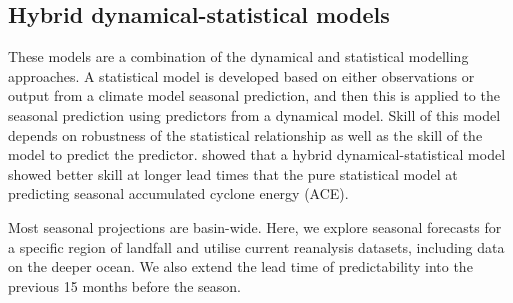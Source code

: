 \subsection{Hybrid dynamical-statistical models}  
These models are a combination of the dynamical and statistical modelling approaches. A statistical model is developed based on either observations or output from a climate model seasonal prediction, and then this is applied to the seasonal prediction using predictors from a dynamical model. Skill of this model depends on robustness of the statistical relationship as well as the skill of the model to predict the predictor. \cite{zhan2016cfsv2} showed that a hybrid dynamical-statistical model showed better skill at longer lead times that the pure statistical model at predicting seasonal accumulated cyclone energy (ACE).





Most seasonal projections are basin-wide. Here, we explore seasonal forecasts for a specific region of landfall and utilise current reanalysis datasets, including data on the deeper ocean. We also extend the lead time of predictability into the previous 15 months before the season.%






